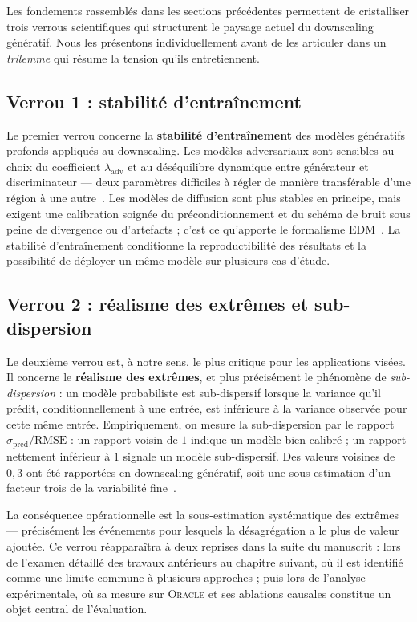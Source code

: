\documentclass[14pt,a4paper,openany]{extreport}
\theoremstyle{definition}
\newcommand{\Oracle}{\textsc{Oracle}}
\begin{document}
Les fondements rassemblés dans les sections précédentes permettent de cristalliser trois verrous scientifiques qui structurent le paysage actuel du downscaling génératif. Nous les présentons individuellement avant de les articuler dans un \emph{trilemme} qui résume la tension qu'ils entretiennent.

\subsection{Verrou 1 : stabilité d'entraînement}
\label{ssec:verrou-stabilite}

Le premier verrou concerne la \textbf{stabilité d'entraînement} des modèles génératifs profonds appliqués au downscaling. Les modèles adversariaux sont sensibles au choix du coefficient $\lambda_{\mathrm{adv}}$ et au déséquilibre dynamique entre générateur et discriminateur --- deux paramètres difficiles à régler de manière transférable d'une région à une autre~\cite{rampal_cgan_2024}. Les modèles de diffusion sont plus stables en principe, mais exigent une calibration soignée du préconditionnement et du schéma de bruit sous peine de divergence ou d'artefacts ; c'est ce qu'apporte le formalisme EDM~\cite{karras_edm_2022}. La stabilité d'entraînement conditionne la reproductibilité des résultats et la possibilité de déployer un même modèle sur plusieurs cas d'étude.

\subsection{Verrou 2 : réalisme des extrêmes et sub-dispersion}
\label{ssec:verrou-extremes}

Le deuxième verrou est, à notre sens, le plus critique pour les applications visées. Il concerne le \textbf{réalisme des extrêmes}, et plus précisément le phénomène de \emph{sub-dispersion} : un modèle probabiliste est sub-dispersif lorsque la variance qu'il prédit, conditionnellement à une entrée, est inférieure à la variance observée pour cette même entrée. Empiriquement, on mesure la sub-dispersion par le rapport $\sigma_{\mathrm{pred}} / \mathrm{RMSE}$ : un rapport voisin de $1$ indique un modèle bien calibré ; un rapport nettement inférieur à $1$ signale un modèle sub-dispersif. Des valeurs voisines de $0{,}3$ ont été rapportées en downscaling génératif, soit une sous-estimation d'un facteur trois de la variabilité fine~\cite{rampal_cgan_2024,mardani_corrdiff_2023,harris_2022}.

La conséquence opérationnelle est la sous-estimation systématique des extrêmes --- précisément les événements pour lesquels la désagrégation a le plus de valeur ajoutée. Ce verrou réapparaîtra à deux reprises dans la suite du manuscrit : lors de l'examen détaillé des travaux antérieurs au chapitre suivant, où il est identifié comme une limite commune à plusieurs approches ; puis lors de l'analyse expérimentale, où sa mesure sur \Oracle{} et ses ablations causales constitue un objet central de l'évaluation.
\end{document}
